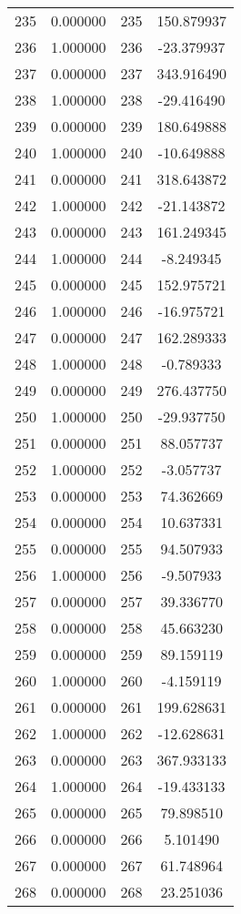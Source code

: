 \documentclass[12pt]{article}
\begin{document}
\begin{longtable}{@{}cccc@{}}
235 & 0.000000 & 235 & 150.879937 \\
236 & 1.000000 & 236 & -23.379937 \\
237 & 0.000000 & 237 & 343.916490 \\
238 & 1.000000 & 238 & -29.416490 \\
239 & 0.000000 & 239 & 180.649888 \\
240 & 1.000000 & 240 & -10.649888 \\
241 & 0.000000 & 241 & 318.643872 \\
242 & 1.000000 & 242 & -21.143872 \\
243 & 0.000000 & 243 & 161.249345 \\
244 & 1.000000 & 244 & -8.249345 \\
245 & 0.000000 & 245 & 152.975721 \\
246 & 1.000000 & 246 & -16.975721 \\
247 & 0.000000 & 247 & 162.289333 \\
248 & 1.000000 & 248 & -0.789333 \\
249 & 0.000000 & 249 & 276.437750 \\
250 & 1.000000 & 250 & -29.937750 \\
251 & 0.000000 & 251 & 88.057737 \\
252 & 1.000000 & 252 & -3.057737 \\
253 & 0.000000 & 253 & 74.362669 \\
254 & 0.000000 & 254 & 10.637331 \\
255 & 0.000000 & 255 & 94.507933 \\
256 & 1.000000 & 256 & -9.507933 \\
257 & 0.000000 & 257 & 39.336770 \\
258 & 0.000000 & 258 & 45.663230 \\
259 & 0.000000 & 259 & 89.159119 \\
260 & 1.000000 & 260 & -4.159119 \\
261 & 0.000000 & 261 & 199.628631 \\
262 & 1.000000 & 262 & -12.628631 \\
263 & 0.000000 & 263 & 367.933133 \\
264 & 1.000000 & 264 & -19.433133 \\
265 & 0.000000 & 265 & 79.898510 \\
266 & 0.000000 & 266 & 5.101490 \\
267 & 0.000000 & 267 & 61.748964 \\
268 & 0.000000 & 268 & 23.251036 \\

\end{longtable}
\end{document}
